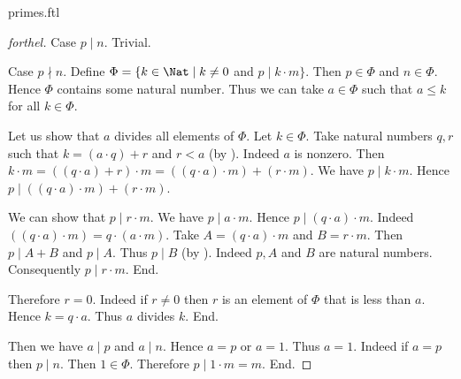 \documentclass{naproche-library}
\begin{document}
\begin{smodule}{primes.ftl}
\begin{proof}[forthel]
    Case $p \mid n$. Trivial.

    Case $p \nmid n$.
      Define $\Phi = \{ k \in \Nat \mid k \neq 0$ and $p \mid k \cdot m \}$.
      Then $p \in \Phi$ and $n \in \Phi$.
      Hence $\Phi$ contains some natural number.
      Thus we can take $a \in \Phi$ such that $a \leq k$ for all $k \in \Phi$.

      Let us show that $a$ divides all elements of $\Phi$.
        Let $k \in \Phi$.
        Take natural numbers $q, r$ such that $k = (a \cdot q) + r$ and $r < a$ (by ).
        Indeed $a$ is nonzero.
        Then $k \cdot m
          = ((q \cdot a) + r) \cdot m
          = ((q \cdot a) \cdot m) + (r \cdot m)$.
        We have $p \mid k \cdot m$.
        Hence $p \mid ((q \cdot a) \cdot m) + (r \cdot m)$.

        We can show that $p \mid r \cdot m$.
          We have $p \mid a \cdot m$.
          Hence $p \mid (q \cdot a) \cdot m$.
          Indeed $((q \cdot a) \cdot m) = q \cdot (a \cdot m)$. %
          Take $A = (q \cdot a) \cdot m$ and $B = r \cdot m$. %
          Then $p \mid A + B$ and $p \mid A$.
          Thus $p \mid B$ (by ).
          Indeed $p, A$ and $B$ are natural numbers.
          Consequently $p \mid r \cdot m$.
        End.

        Therefore $r = 0$.
        Indeed if $r \neq 0$ then $r$ is an element of $\Phi$ that is less than $a$.
        Hence $k = q \cdot a$.
        Thus $a$ divides $k$.
      End.

      Then we have $a \mid p$ and $a \mid n$.
      Hence $a = p$ or $a = 1$.
      Thus $a = 1$.
      Indeed if $a = p$ then $p \mid n$.
      Then $1 \in \Phi$.
      Therefore $p \mid 1 \cdot m = m$.
    End.
  \end{proof}
\end{smodule}
\end{document}
